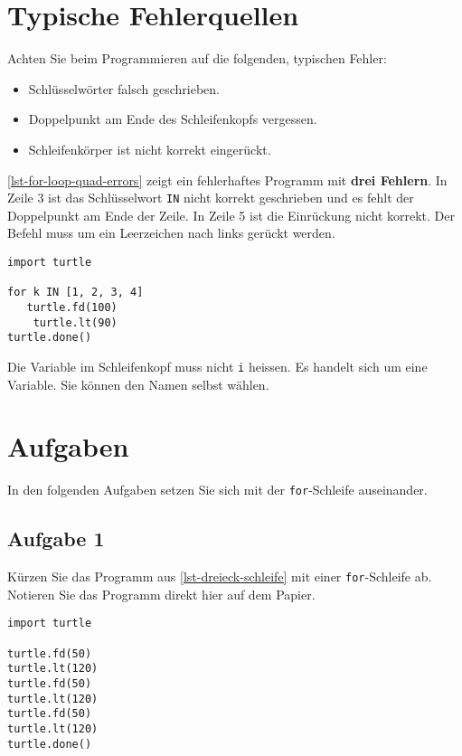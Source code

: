 \section{Typische Fehlerquellen}

Achten Sie beim Programmieren auf die folgenden, typischen Fehler:

\begin{itemize}
	\item Schlüsselwörter falsch geschrieben.
	\item Doppelpunkt am Ende des Schleifenkopfs vergessen.
	\item Schleifenkörper ist nicht korrekt eingerückt.
\end{itemize}
\autoref{lst-for-loop-quad-errors} zeigt ein fehlerhaftes Programm mit \textbf{drei Fehlern}. In Zeile 3 ist das Schlüsselwort \lstinline{IN} nicht korrekt geschrieben und es fehlt der Doppelpunkt am Ende der Zeile. In Zeile \num{5} ist die Einrückung nicht korrekt. Der Befehl muss um ein Leerzeichen nach links gerückt werden.

\begin{lstlisting}[caption={Achtung, dies ist ein \textbf{fehlerhaftes} Programm.}, label=lst-for-loop-quad-errors]
import turtle

for k IN [1, 2, 3, 4]
   turtle.fd(100)
    turtle.lt(90)
turtle.done()
\end{lstlisting}

\begin{hinweis}
Die Variable im Schleifenkopf muss nicht \lstinline{i} heissen. Es handelt sich um eine  Variable. Sie können den Namen selbst wählen.
\end{hinweis}

\section{Aufgaben}

In den folgenden Aufgaben setzen Sie sich mit der \lstinline{for}-Schleife auseinander.

\subsection{Aufgabe 1}

Kürzen Sie das Programm aus \autoref{lst-dreieck-schleife} mit einer \lstinline{for}-Schleife ab. Notieren Sie das Programm direkt hier auf dem Papier.

\begin{minipage}{0.6\textwidth}
\centering
\fillwithgrid{1.9in}
\end{minipage}
\hfill
\begin{minipage}{0.375\textwidth}
\centering
\begin{lstlisting}[caption={Gleichseitiges Dreieck.}, label=lst-dreieck-schleife]
import turtle

turtle.fd(50)
turtle.lt(120)
turtle.fd(50)
turtle.lt(120)
turtle.fd(50)
turtle.lt(120)
turtle.done()
\end{lstlisting}
\end{minipage}

